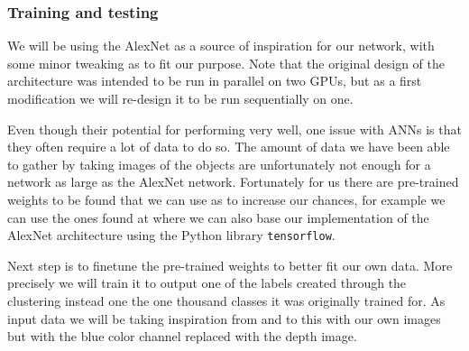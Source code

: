 \subsubsection{Training and testing}

We will be using the AlexNet as a source of inspiration for our network, with some minor tweaking as to fit our purpose. Note that the original design of the architecture was intended to be run in parallel on two GPUs, but as a first modification we will re-design it to be run sequentially on one.

Even though their potential for performing very well, one issue with ANNs is that they often require a lot of data to do so. The amount of data we have been able to gather by taking images of the objects are unfortunately not enough for a network as large as the AlexNet network. Fortunately for us there are pre-trained weights to be found that we can use as to increase our chances, for example we can use the ones found at \parencite{AlexNetImplWeights} where we can also base our implementation of the AlexNet architecture using the Python library \texttt{tensorflow}.

Next step is to finetune the pre-trained weights to better fit our own data. More precisely we will train it to output one of the labels created through the clustering instead one the one thousand classes it was originally trained for. As input data we will be taking inspiration from \parencite{Redmon2014} and to this with our own images but with the blue color channel replaced with the depth image.

